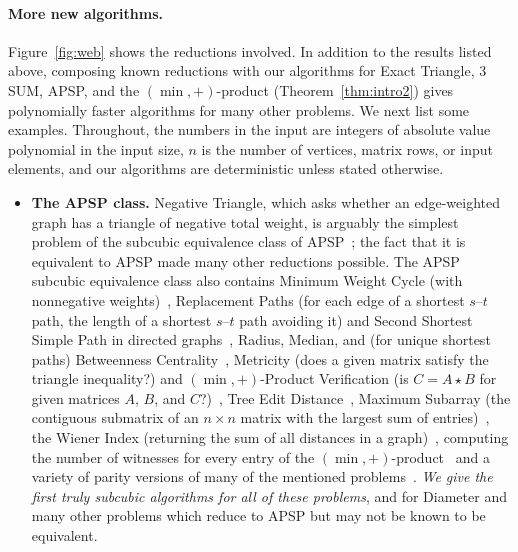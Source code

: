 \paragraph{More new algorithms.}
Figure~\ref{fig:web} shows the reductions involved. In addition to the results listed above, composing known reductions with our algorithms for Exact Triangle, $3$SUM, APSP, and the $(\min,+)$-product (Theorem~\ref{thm:intro2}) gives polynomially faster algorithms for many other problems. We next list some examples. Throughout, the numbers in the input are integers of absolute value polynomial in the input size, $n$ is the number of vertices, matrix rows, or input elements, and our algorithms are deterministic unless stated otherwise.
\begin{itemize}
\item \textbf{The APSP class.} Negative Triangle, which asks whether an edge-weighted graph has a triangle of negative total weight, is arguably the simplest problem of the subcubic equivalence class of APSP~\cite{VW10,VW18}; the fact that it is equivalent to APSP made many other reductions possible. The APSP subcubic equivalence class also contains Minimum Weight Cycle (with nonnegative weights)~\cite{RV11,VW10,VW18}, Replacement Paths (for each edge of a shortest $s$--$t$ path, the length of a shortest $s$--$t$ path avoiding it) and Second Shortest Simple Path in directed graphs~\cite{VW10,VW18}, Radius, Median, and (for unique shortest paths) Betweenness Centrality~\cite{AGV15,AGV23}, Metricity (does a given matrix satisfy the triangle inequality?) and $(\min,+)$-Product Verification (is $C=A\star B$ for given matrices $A$, $B$, and $C$?)~\cite{VW10,VW18}, Tree Edit Distance~\cite{BGMW20,NPSVXY25}, Maximum Subarray (the contiguous submatrix of an $n\times n$ matrix with the largest sum of entries)~\cite{TT00,BDT16}, the Wiener Index (returning the sum of all distances in a graph)~\cite{LVW18}, computing the number of witnesses for every entry of the $(\min,+)$-product~\cite{CVX23} and a variety of parity versions of many of the mentioned problems~\cite{paritypaper}. \emph{We give the first truly subcubic algorithms for all of these problems}, and for Diameter and many other problems which reduce to APSP but may not be known to be equivalent.


\end{itemize}
